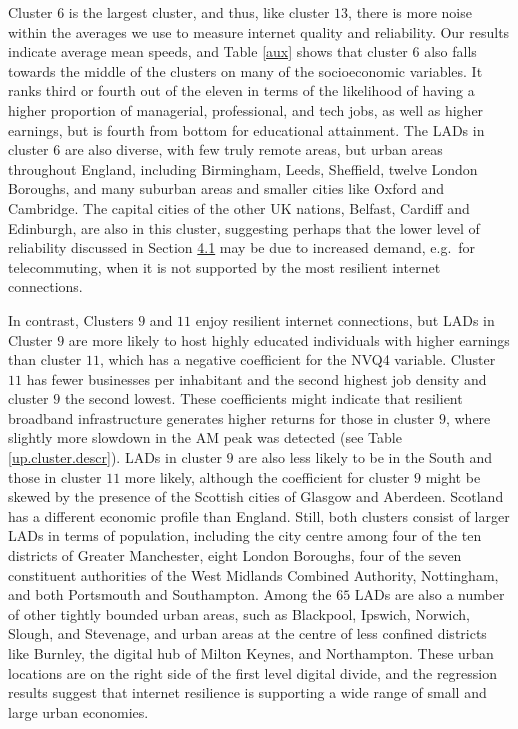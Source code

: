 \documentclass[Royal,times,sageh]{sagej}
\begin{document}
Cluster \(6\) is the largest cluster, and thus, like cluster \(13\),
there is more noise within the averages we use to measure internet
quality and reliability. Our results indicate average mean speeds, and
Table \ref{aux} shows that cluster \(6\) also falls towards the middle
of the clusters on many of the socioeconomic variables. It ranks third
or fourth out of the eleven in terms of the likelihood of having a
higher proportion of managerial, professional, and tech jobs, as well as
higher earnings, but is fourth from bottom for educational attainment.
The LADs in cluster \(6\) are also diverse, with few truly remote areas,
but urban areas throughout England, including Birmingham, Leeds,
Sheffield, twelve London Boroughs, and many suburban areas and smaller
cities like Oxford and Cambridge. The capital cities of the other UK
nations, Belfast, Cardiff and Edinburgh, are also in this cluster,
suggesting perhaps that the lower level of reliability discussed in
Section \protect\hyperlink{sec:4.1}{4.1} may be due to increased demand,
e.g.~for telecommuting, when it is not supported by the most resilient
internet connections.

In contrast, Clusters \(9\) and \(11\) enjoy resilient internet
connections, but LADs in Cluster \(9\) are more likely to host highly
educated individuals with higher earnings than cluster \(11\), which has
a negative coefficient for the NVQ4 variable. Cluster \(11\) has fewer
businesses per inhabitant and the second highest job density and cluster
\(9\) the second lowest. These coefficients might indicate that
resilient broadband infrastructure generates higher returns for those in
cluster \(9\), where slightly more slowdown in the AM peak was detected
(see Table \ref{up.cluster.descr}). LADs in cluster \(9\) are also less
likely to be in the South and those in cluster \(11\) more likely,
although the coefficient for cluster \(9\) might be skewed by the
presence of the Scottish cities of Glasgow and Aberdeen. Scotland has a
different economic profile than England. Still, both clusters consist of
larger LADs in terms of population, including the city centre among four
of the ten districts of Greater Manchester, eight London Boroughs, four
of the seven constituent authorities of the West Midlands Combined
Authority, Nottingham, and both Portsmouth and Southampton. Among the
\(65\) LADs are also a number of other tightly bounded urban areas, such
as Blackpool, Ipswich, Norwich, Slough, and Stevenage, and urban areas
at the centre of less confined districts like Burnley, the digital hub
of Milton Keynes, and Northampton. These urban locations are on the
right side of the first level digital divide, and the regression results
suggest that internet resilience is supporting a wide range of small and
large urban economies.
\end{document}

